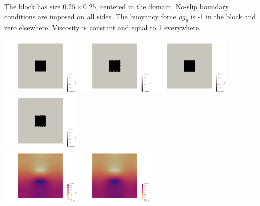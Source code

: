 The block has size $0.25\times 0.25$, centered in the domain. No-slip boundary conditions are imposed on all 
sides. The buoyancy force $\rho g_y$ is -1 in the block and zero elsewhere. Viscosity is constant and 
equal to 1 everywhere. 

\begin{center}
\includegraphics[width=3.8cm]{python_codes/fieldstone_78/results/block/reduced/by0}
\includegraphics[width=3.8cm]{python_codes/fieldstone_78/results/block/reduced/by1}
\includegraphics[width=3.8cm]{python_codes/fieldstone_78/results/block/reduced/by2}
\includegraphics[width=3.8cm]{python_codes/fieldstone_78/results/block/reduced/by3}\\
\includegraphics[width=3.8cm]{python_codes/fieldstone_78/results/block/reduced/p0}
\includegraphics[width=3.8cm]{python_codes/fieldstone_78/results/block/reduced/p1}

\end{center}
